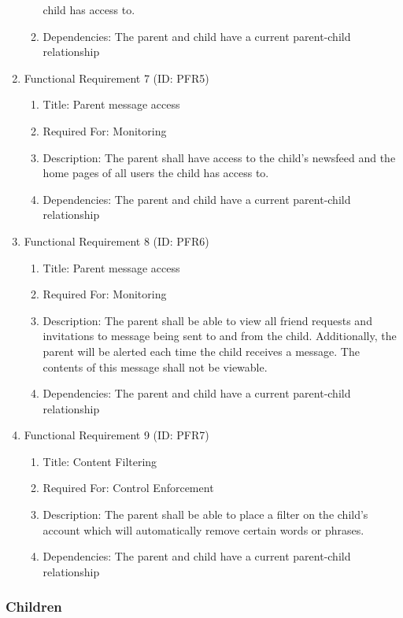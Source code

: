 \documentclass[12pt]{article}
\begin{document}
\begin{enumerate}
\begin{enumerate}
        child has access to.
        \item Dependencies: The parent and child have a current parent-child relationship
    \end{enumerate}
    \item Functional Requirement 7 (ID: PFR5)
    \begin{enumerate}
        \item Title: Parent message access
        \item Required For: Monitoring
        \item Description: The parent shall have access to the child’s newsfeed and the home pages of all users
        the child has access to.
        \item Dependencies: The parent and child have a current parent-child relationship
    \end{enumerate}
    \item Functional Requirement 8 (ID: PFR6)
    \begin{enumerate}
        \item Title: Parent message access
        \item Required For: Monitoring
        \item Description: The parent shall be able to view all friend requests and invitations to message being
        sent to and from the child. Additionally, the parent will be alerted each time the child receives a message.
        The contents of this message shall not be viewable.
        \item Dependencies: The parent and child have a current parent-child relationship
    \end{enumerate}
    \item Functional Requirement 9 (ID: PFR7)
    \begin{enumerate}
        \item Title: Content Filtering
        \item Required For: Control Enforcement
        \item Description: The parent shall be able to place a filter on the child’s account which will automatically
        remove certain words or phrases.
        \item Dependencies: The parent and child have a current parent-child relationship
    \end{enumerate}
\end{enumerate}

\subsubsection{Children}
\end{document}
